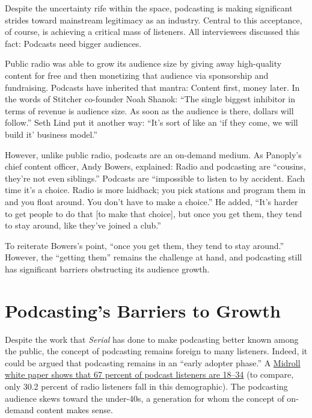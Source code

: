 \documentclass[notoc, symmetric, nobib, nols]{towcenter-guideto-book}
\begin{document}
Despite the uncertainty rife within the space, podcasting is making significant strides toward mainstream legitimacy as an industry. Central to this acceptance, of course, is achieving a critical mass of listeners. All interviewees discussed this fact: Podcasts need bigger audiences. 

Public radio was able to grow its audience size by giving away high-quality content for free and then monetizing that audience via sponsorship and fundraising. Podcasts have inherited that mantra: Content first, money later. In the words of Stitcher co-founder Noah Shanok: ``The single biggest inhibitor in terms of revenue is audience size. As soon as the audience is there, dollars will follow.''\autocite{shanok} Seth Lind put it another way: ``It's sort of like an `if they come, we will build it' business model.''\autocite{lind}

However, unlike public radio, podcasts are an on-demand medium. As Panoply's chief content officer, Andy Bowers, explained: Radio and podcasting are ``cousins, they're not even siblings.'' Podcasts are ``impossible to listen to by accident. Each time it's a choice. Radio is more laidback; you pick stations and program them in and you float around. You don't have to make a choice.'' He added, ``It's harder to get people to do that [to make that choice], but once you get them, they tend to stay around, like they've joined a club.''\autocite{bowers}

To reiterate Bowers's point, ``once you get them, they tend to stay around.''\autocite{bowers} However, the ``getting them'' remains the challenge at hand, and podcasting still has significant barriers obstructing its audience growth.

\section{Podcasting's Barriers to Growth}

Despite the work that \textit{Serial} has done to make podcasting better known among the public, the concept of podcasting remains foreign to many listeners. Indeed, it could be argued that podcasting remains in an ``early adopter phase.'' A \href{http://awesome.midroll.com}{Midroll white paper shows that 67 percent of podcast listeners are 18--34} (to compare, only 30.2 percent of radio listeners fall in this demographic).\autocite{midrollpaper} The podcasting audience skews toward the under-40s, a generation for whom the concept of on-demand content makes sense. 
\end{document}
